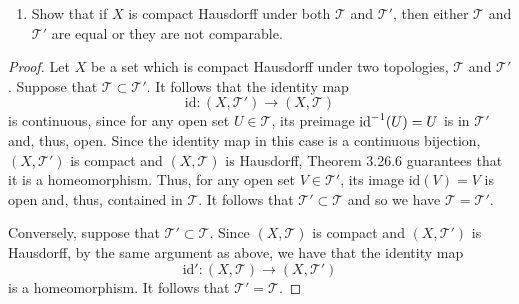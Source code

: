 \begin{solution}
  \begin{enumerate}[label={(\alph*)}, align=left, leftmargin=\parindent, listparindent=\parindent, labelwidth=0pt, itemindent=!]
    \addtocounter{enumi}{1}
    \item
          Show that if $X$ is compact Hausdorff under both $\mathcal{T}$ and $\mathcal{T}'$, then either $\mathcal{T}$ and $\mathcal{T}'$ are equal or they are not comparable.
  \end{enumerate}
  \begin{proof}
    Let $X$ be a set which is compact Hausdorff under two topologies, $\mathcal{T}$ and $\mathcal{T}'$.
    Suppose that $\mathcal{T} \subset \mathcal{T}'$.
    It follows that the identity map
    \begin{equation*}
      \text{id}: (X, \mathcal{T}') \rightarrow (X, \mathcal{T})
    \end{equation*}
    is continuous, since for any open set $U \in \mathcal{T}$, its preimage $\text{id}^{-1}(U) = U$ is in $\mathcal{T}'$ and, thus, open.
    Since the identity map in this case is a continuous bijection, $(X, \mathcal{T}')$ is compact and $(X, \mathcal{T})$ is Hausdorff, Theorem 3.26.6 guarantees that it is a homeomorphism.
    Thus, for any open set $V \in \mathcal{T}'$, its image $\text{id}(V) = V$ is open and, thus, contained in $\mathcal{T}$.
    It follows that $\mathcal{T}' \subset \mathcal{T}$ and so we have $\mathcal{T} = \mathcal{T}'$.

    Conversely, suppose that $\mathcal{T}' \subset \mathcal{T}$.
    Since $(X, \mathcal{T})$ is compact and $(X, \mathcal{T}')$ is Hausdorff, by the same argument as above, we have that the identity map
    \begin{equation*}
      \text{id}': (X, \mathcal{T}) \rightarrow (X, \mathcal{T}')
    \end{equation*}
    is a homeomorphism.
    It follows that $\mathcal{T}' = \mathcal{T}$.
  \end{proof}
\end{solution}
\newpage

